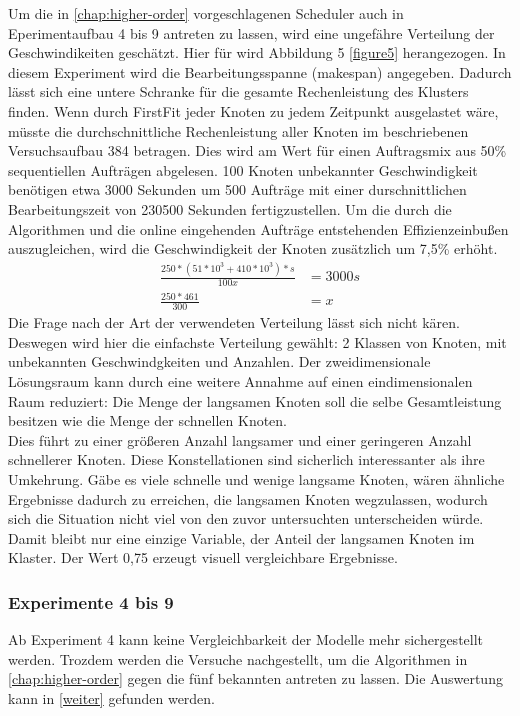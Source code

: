 Um die in \ref{chap:higher-order} vorgeschlagenen Scheduler auch in Eperimentaufbau 4 bis 9 antreten zu lassen, wird eine ungefähre Verteilung der Geschwindikeiten geschätzt.
Hier für wird Abbildung 5 \ref{figure5} herangezogen. In diesem Experiment wird die Bearbeitungsspanne (makespan) angegeben. Dadurch lässt sich eine untere Schranke für die gesamte Rechenleistung des Klusters finden. Wenn durch FirstFit jeder Knoten zu jedem Zeitpunkt ausgelastet wäre, müsste die durchschnittliche Rechenleistung aller Knoten im beschriebenen Versuchsaufbau 384 betragen. Dies wird am Wert für einen Auftragsmix aus 50\% sequentiellen Aufträgen abgelesen. 100 Knoten unbekannter Geschwindigkeit benötigen etwa 3000 Sekunden um 500 Aufträge mit einer durschnittlichen Bearbeitungszeit von 230500 Sekunden fertigzustellen. Um die durch die Algorithmen und die online eingehenden Aufträge entstehenden Effizienzeinbußen auszugleichen, wird die Geschwindigkeit der Knoten zusätzlich um 7,5\% erhöht.
\begin{align*}
\frac{250*(51* 10^3 + 410*10^3)*s}{100x} &= 3000s \\
\frac{250*461}{300} &= x
\end{align*}
Die Frage nach der Art der verwendeten Verteilung lässt sich nicht kären. Deswegen wird hier die einfachste Verteilung gewählt: 2 Klassen von Knoten, mit unbekannten Geschwindgkeiten und Anzahlen. Der zweidimensionale Lösungsraum kann durch eine weitere Annahme auf einen eindimensionalen Raum reduziert: Die Menge der langsamen Knoten soll die selbe Gesamtleistung besitzen wie die Menge der schnellen Knoten.\\
Dies führt zu einer größeren Anzahl langsamer und einer geringeren Anzahl schnellerer Knoten. Diese Konstellationen sind sicherlich interessanter als ihre Umkehrung. Gäbe es viele schnelle und wenige langsame Knoten, wären ähnliche Ergebnisse dadurch zu erreichen, die langsamen Knoten wegzulassen, wodurch sich die Situation nicht viel von den zuvor untersuchten unterscheiden würde.\\
Damit bleibt nur eine einzige Variable, der Anteil der langsamen Knoten im Klaster. Der Wert 0,75 erzeugt visuell vergleichbare Ergebnisse.

\FloatBarrier

\subsubsection{Experimente 4 bis 9}
Ab Experiment 4 kann keine Vergleichbarkeit der Modelle mehr sichergestellt werden. Trozdem werden die Versuche nachgestellt, um die Algorithmen in \ref{chap:higher-order} gegen die fünf bekannten antreten zu lassen. Die Auswertung kann in \ref{weiter} gefunden werden.


